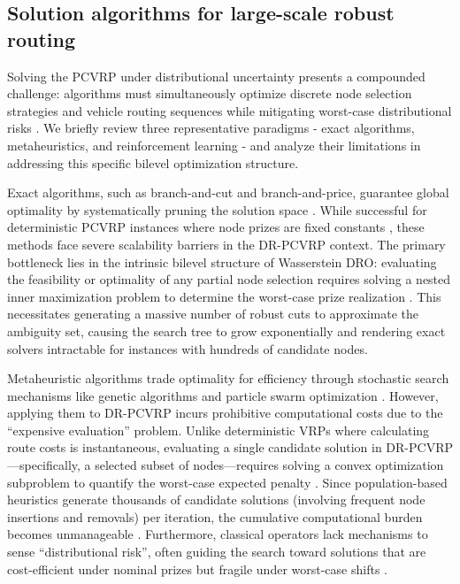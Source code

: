 \documentclass[preprint,12pt,authoryear]{elsarticle}
\theoremstyle{definition}
\begin{document}
\subsection{Solution algorithms for large-scale robust routing}\label{subsec:solution_algorithms}

Solving the PCVRP under distributional uncertainty presents a compounded challenge: algorithms must simultaneously optimize discrete node selection strategies and vehicle routing sequences while mitigating worst-case distributional risks \citep{kuhn2025distributionally}. We briefly review three representative paradigms - exact algorithms, metaheuristics, and reinforcement learning - and analyze their limitations in addressing this specific bilevel optimization structure.

Exact algorithms, such as branch-and-cut and branch-and-price, guarantee global optimality by systematically pruning the solution space \citep{yu2022improving}. While successful for deterministic PCVRP instances where node prizes are fixed constants \citep{baldacci2020optimal}, these methods face severe scalability barriers in the DR-PCVRP context. The primary bottleneck lies in the intrinsic bilevel structure of Wasserstein DRO: evaluating the feasibility or optimality of any partial node selection requires solving a nested inner maximization problem to determine the worst-case prize realization \citep{zhang2021benders}. This necessitates generating a massive number of robust cuts to approximate the ambiguity set, causing the search tree to grow exponentially and rendering exact solvers intractable for instances with hundreds of candidate nodes.

Metaheuristic algorithms trade optimality for efficiency through stochastic search mechanisms like genetic algorithms and particle swarm optimization \citep{wouda2024pyvrp,wang2009hybrid,tang2006iterated}. However, applying them to DR-PCVRP incurs prohibitive computational costs due to the ``expensive evaluation'' problem. Unlike deterministic VRPs where calculating route costs is instantaneous, evaluating a single candidate solution in DR-PCVRP—specifically, a selected subset of nodes—requires solving a convex optimization subproblem to quantify the worst-case expected penalty \citep{marinakis2010hybrid}. Since population-based heuristics generate thousands of candidate solutions (involving frequent node insertions and removals) per iteration, the cumulative computational burden becomes unmanageable \citep{li2016two}. Furthermore, classical operators lack mechanisms to sense ``distributional risk'', often guiding the search toward solutions that are cost-efficient under nominal prizes but fragile under worst-case shifts \citep{ho2008hybrid}.
\end{document}
